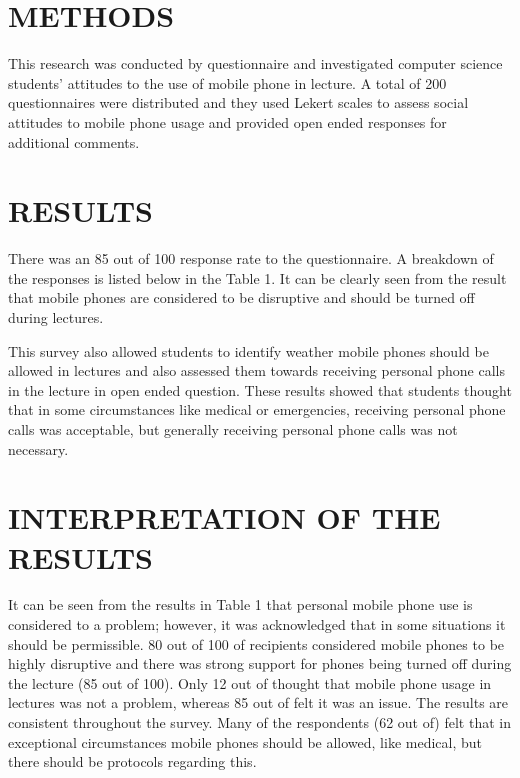 \documentclass{article}
\begin{document}
\section{METHODS}\label{sec:into}
This research was conducted by questionnaire and investigated computer science students’ attitudes to the use of mobile phone in lecture. A total of 200 questionnaires were distributed and they used Lekert scales to assess social attitudes to mobile phone usage and provided open ended responses for additional comments.

\section{RESULTS}\label{sec:into}
There was an 85 out of 100 response rate to the questionnaire. A breakdown of the responses is listed below in the Table 1. It can be clearly seen from the result that mobile phones are considered to be disruptive and should be turned off during  lectures.

 





This survey also allowed students to identify weather mobile phones should be allowed in lectures and also assessed them towards receiving personal phone calls in the lecture in open ended question. These results showed that students thought that in some circumstances like medical or emergencies, receiving personal phone calls was acceptable, but generally receiving personal phone calls was not necessary.

\section{INTERPRETATION OF THE RESULTS}\label{sec:into}
It can be seen from the results in Table 1 that personal mobile phone use is considered
to a problem; however, it was acknowledged that in some situations it should be
permissible. 80 out of 100 of recipients considered mobile phones to be highly disruptive and
there was strong support for phones being turned off during the lecture (85 out of 100). Only 12 out of
thought that mobile phone usage in lectures was not a problem,
whereas 85 out of felt it was an issue. The results are consistent throughout the survey.
Many of the respondents (62 out of) felt that in exceptional circumstances mobile phones
should be allowed, like medical, but there should be protocols regarding this.
\end{document}
